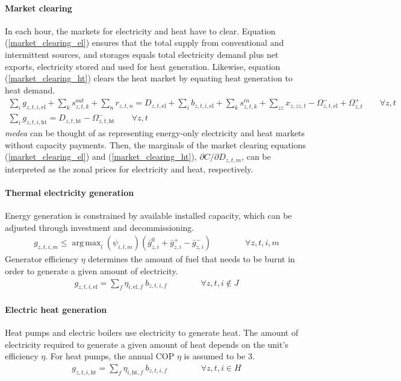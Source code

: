 \documentclass[11pt,a4paper]{article}
\DeclareMathOperator*{\argmax}{arg\,max}
\begin{document}
\paragraph{Market clearing}
In each hour, the markets for electricity and heat have to clear.
Equation (\ref{market_clearing_el}) ensures that the total supply from conventional and intermittent sources, and storages equals total electricity demand plus net exports, electricity stored and used for heat generation. 
Likewise, equation (\ref{market_clearing_ht}) clears the heat market by equating heat generation to heat demand.
\begin{align}
\sum_{i} g_{z,t,i,\text{el}} + \sum_{k} s^{out}_{z,t,k} + \sum_{n} r_{z,t,n} =
D_{z,t,\text{el}} + \sum_{i} b_{z,t,i,\text{el}} + \sum_{k} s^{in}_{z,t,k} + \sum_{zz} x_{z,zz,t} 
- \Omega^{-}_{z,t,\text{el}} + \Omega^{+}_{z,t} \qquad \forall z,t \label{market_clearing_el} \\
\sum_{i} g_{z,t,i,\text{ht}} = D_{z,t,\text{ht}} - \Omega^{-}_{z,t,\text{ht}} \qquad \forall z,t \label{market_clearing_ht}
\end{align}
\emph{medea} can be thought of as representing energy-only electricity and heat markets without capacity payments. Then, the marginals of the market clearing equations (\ref{market_clearing_el}) and (\ref{market_clearing_ht}), $\partial C / \partial D_{z,t,m}$, can be interpreted as the zonal prices for electricity and heat, respectively.

\paragraph{Thermal electricity generation}
Energy generation is constrained by available installed capacity, which can be adjusted through investment and decommissioning.
\begin{align}
g_{z,t,i,m} \leq \argmax_{l}(\psi_{i,l,m}) \left( \bar{g}^{0}_{z,i} + \bar{g}^{+}_{z,i} - \bar{g}^{-}_{z,i} \right) \qquad \qquad \forall z,t,i,m
\end{align}
Generator efficiency $\eta$ determines the amount of fuel that needs to be burnt in order to generate a given amount of electricity.
\begin{align}
g_{z,t,i,\text{el}} = \sum_{f} \eta_{i,\text{el},f} \: b_{z,t,i,f} \qquad \qquad \forall z,t,i \notin J
\end{align}

\paragraph{Electric heat generation}
Heat pumps and electric boilers use electricity to generate heat. The amount of electricity required to generate a given amount of heat depends on the unit's efficiency $\eta$. For heat pumps, the annual COP $\eta$ is assumed to be $3$.
\begin{align}
g_{z,t,i,\text{ht}} = \sum_{f} \eta_{i,\text{ht},f} \: b_{z,t,i,f} \qquad \qquad \forall z,t,i \in H
\end{align}
\end{document}
